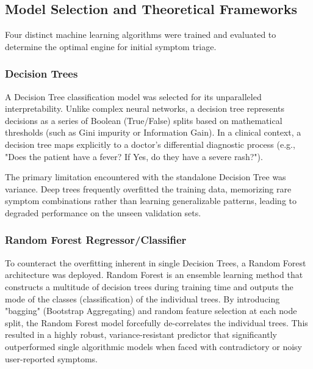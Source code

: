 \documentclass[12pt]{article}
\begin{document}
\subsection{Model Selection and Theoretical Frameworks}
Four distinct machine learning algorithms were trained and evaluated to determine the optimal engine for initial symptom triage. 

\subsubsection{Decision Trees}
A Decision Tree classification model was selected for its unparalleled interpretability. Unlike complex neural networks, a decision tree represents decisions as a series of Boolean (True/False) splits based on mathematical thresholds (such as Gini impurity or Information Gain). In a clinical context, a decision tree maps explicitly to a doctor's differential diagnostic process (e.g., "Does the patient have a fever? If Yes, do they have a severe rash?"). 


The primary limitation encountered with the standalone Decision Tree was variance. Deep trees frequently overfitted the training data, memorizing rare symptom combinations rather than learning generalizable patterns, leading to degraded performance on the unseen validation sets.

\subsubsection{Random Forest Regressor/Classifier}
To counteract the overfitting inherent in single Decision Trees, a Random Forest architecture was deployed. Random Forest is an ensemble learning method that constructs a multitude of decision trees during training time and outputs the mode of the classes (classification) of the individual trees. By introducing "bagging" (Bootstrap Aggregating) and random feature selection at each node split, the Random Forest model forcefully de-correlates the individual trees. This resulted in a highly robust, variance-resistant predictor that significantly outperformed single algorithmic models when faced with contradictory or noisy user-reported symptoms.
\end{document}
